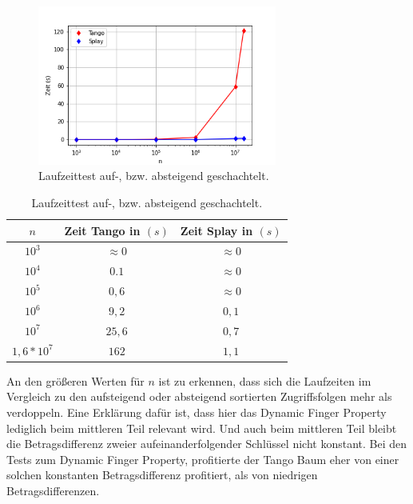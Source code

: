 \documentclass[a4paper,12pt]{article}
\begin{document}
\begin{figure}[H]
	\centering
	\includegraphics[width=0.7\textwidth]{Medien/laufzeittest/diagramm/sorted3}
	\caption{Laufzeittest auf-, bzw. absteigend geschachtelt.}
\end{figure}
\begin{table}[H]
	\begin{center}
		\begin{tabular}[c]{|c|c|c|}
			\hline
		$n$ & Zeit Tango in $\left(s\right)$ &Zeit Splay in $\left(s\right)$ \\
		\hline 
		$10^3$ & $\approx 0$ &$\approx 0$ \\
		\hline
		$10^4$  & $0.1$ &$\approx 0$  \\
		\hline
		$10^5$  & $0,6$ &$\approx 0$  \\
		\hline
		$10^6$  & $9,2$ &$0,1$  \\
		\hline
		$10^7$  & $25,6$ &$0,7$  \\
		\hline
		$1,6 *10^7$  & $162$ &$1,1$  \\
		\hline
		\end{tabular}
		\caption{Laufzeittest auf-, bzw. absteigend geschachtelt.} 
	\end{center}
\end{table}
  
\noindent An den größeren Werten für $n$ ist zu erkennen, dass sich die Laufzeiten im Vergleich zu den aufsteigend oder absteigend sortierten Zugriffsfolgen mehr als verdoppeln. Eine Erklärung dafür ist, dass hier das Dynamic Finger Property lediglich beim mittleren Teil relevant wird. Und auch beim mittleren Teil bleibt die Betragsdifferenz zweier aufeinanderfolgender Schlüssel nicht konstant. Bei den Tests zum Dynamic Finger Property, profitierte der Tango Baum eher von einer solchen konstanten Betragsdifferenz profitiert, als von niedrigen Betragsdifferenzen.

  

\end{document}
